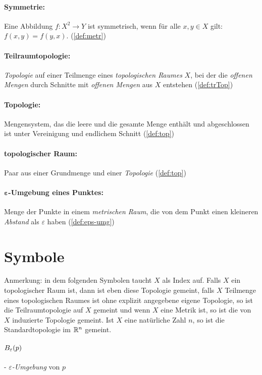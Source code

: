     \paragraph{Symmetrie:} Eine Abbildung $f:X^2 \to Y$ ist symmetrisch, wenn für alle $x,y \in X$ gilt: $f(x,y) = f(y,x)$. (\ref{def:metr})
    
    \paragraph{Teilraumtopologie:} \textit{Topologie} auf einer Teilmenge eines \textit{topologischen Raumes} $X$, bei der die \textit{offenen Mengen} durch Schnitte mit \textit{offenen Mengen} aus $X$ entstehen (\ref{def:trTop})

    \paragraph{Topologie:} Mengensystem, das die leere und die gesamte Menge enthält und abgeschlossen ist unter Vereinigung und endlichem Schnitt (\ref{def:top})

    \paragraph{topologischer Raum:} Paar aus einer Grundmenge und einer \textit{Topologie} (\ref{def:top})
    
    \paragraph{$\boldsymbol{\varepsilon}$-Umgebung eines Punktes:} Menge der Punkte in einem \textit{metrischen Raum}, die von dem Punkt einen kleineren \textit{Abstand} als $\varepsilon$ haben (\ref{def:eps-umg})

\section*{Symbole}

    Anmerkung: in dem folgenden Symbolen taucht $X$ als Index auf. Falls $X$ ein topologischer Raum ist, dann ist eben diese Topologie gemeint, falls $X$ Teilmenge eines topologischen Raumes ist ohne explizit angegebene eigene Topologie, so ist die Teilraumtopologie auf $X$ gemeint und wenn $X$ eine Metrik ist, so ist die von $X$ induzierte Topologie gemeint. Ist $X$ eine natürliche Zahl $n$, so ist die Standardtopologie im $\mathbb{R}^n$ gemeint.
    
    
    \paragraph{$B_\varepsilon(p)$} - \quad \textit{$\varepsilon$-Umgebung} von $p$

